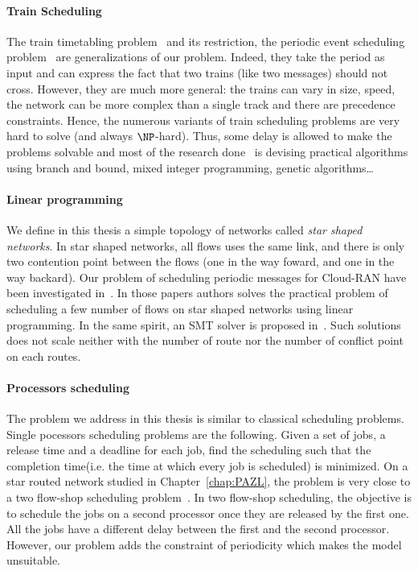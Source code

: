\paragraph{Train Scheduling}
The train timetabling problem~\cite{lusby2011railway} and its restriction, the periodic event scheduling problem~\cite{serafini1989mathematical} are generalizations of our problem. Indeed, they take the period as input and can express the fact that two trains (like two messages) should not cross. However, they are much more general: the trains can vary in size, speed, the network can be more complex than a single track and there are precedence constraints. Hence, the numerous variants of train scheduling problems are very hard to solve (and always $\NP$-hard). Thus, some delay is allowed to make the problems solvable and most of the research done~\cite{lusby2011railway} is devising practical algorithms using branch and bound, mixed integer programming, genetic algorithms\dots  

\paragraph{Linear programming}
We define in this thesis a simple topology of networks called {\em star shaped networks}. In star shaped networks, all flows uses the same link, and there is only two contention point between the flows (one in the way foward, and one in the way backard).
Our problem of scheduling periodic messages for Cloud-RAN have been investigated in~\cite{nayak2017incremental,steiner2018traffic,silviu2017,naresh2016}. In those papers authors solves the practical problem of scheduling a few number of flows on star shaped networks using linear programming. In the same spirit, an SMT solver is proposed in~\cite{dos2019tsnsched}. Such solutions does not scale neither with the number of route nor the number of conflict point on each routes.

\paragraph{Processors scheduling}

The problem we address in this thesis is similar to classical scheduling problems. Single pocessors scheduling problems are the following. Given a set of jobs, a release time and a deadline for each job, find the scheduling such that the completion time(i.e. the time at which every job is scheduled) is minimized.
On a star routed network studied in Chapter~\ref{chap:PAZL}, the problem is very close to a two flow-shop scheduling problem~\cite{yu2004minimizing}. In two flow-shop scheduling, the objective is to schedule the jobs on a second processor once they are released by the first one. All the jobs have a different delay between the first and the second processor. However, our problem adds the constraint of periodicity which makes the model unsuitable.

